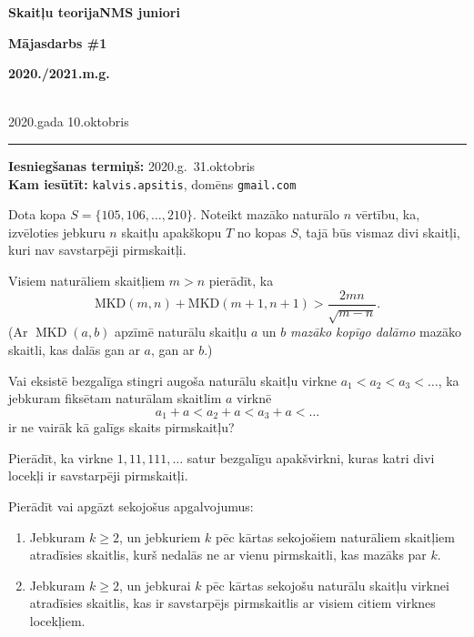 \documentclass[a4paper,12pt]{article}
\begin{document}
\begin{center}
\parbox{3.5cm}{\flushleft\bf Skaitļu teorija\linebreak NMS juniori} \hfill {\bf\LARGE Mājasdarbs \#1} \hfill \parbox{3.5cm}{\flushright\bf 2020./2021.m.g.} \\[2pt]
\rm\small 2020.gada 10.oktobris
\end{center}

\hrule

\vspace{20pt}
{\bf Iesniegšanas termiņš:} 2020.g.\ 31.oktobris\\
{\bf Kam iesūtīt:} {\tt kalvis.apsitis}, domēns {\tt gmail.com}


\vspace{20pt}
\begin{problem}
Dota kopa $S = \{ 105,106,\ldots,210 \}$. Noteikt mazāko
naturālo $n$ vērtību, ka, izvēloties jebkuru $n$ skaitļu
apakškopu $T$ no kopas $S$, tajā būs vismaz divi skaitļi, kuri nav
savstarpēji pirmskaitļi.
\end{problem}

\vspace{20pt}
\begin{problem} 
Visiem naturāliem skaitļiem $m > n$ pierādīt, ka
$$\mbox{MKD}(m,n) + \mbox{MKD}(m+1,n+1) > \frac{2mn}{\sqrt{m-n}}.$$
(Ar $\operatorname{MKD}(a,b)$ apzīmē naturālu skaitļu $a$ un $b$ {\em mazāko 
kopīgo dalāmo} \textendash{} mazāko skaitli, kas dalās gan ar $a$, gan ar $b$.)
\end{problem}

\vspace{20pt}
\begin{problem}
Vai eksistē bezgalīga
stingri augoša naturālu skaitļu virkne $a_1 < a_2 < a_3 <\ldots$,
ka jebkuram fiksētam naturālam skaitlim $a$ virknē 
$$a_1+a < a_2+a < a_3 + a < \ldots$$
ir ne vairāk kā galīgs skaits pirmskaitļu?
\end{problem}

\vspace{20pt}
\begin{problem}
Pierādīt, ka virkne $1,11,111,\ldots$ satur bezgalīgu apakšvirkni,
kuras katri divi locekļi ir savstarpēji pirmskaitļi.
\end{problem}



\vspace{20pt}
\begin{problem}
Pierādīt vai apgāzt sekojošus apgalvojumus:
\begin{enumerate}
\item Jebkuram $k \geq 2$, un jebkuriem $k$ pēc kārtas sekojošiem naturāliem 
skaitļiem atradīsies skaitlis, kurš nedalās ne ar vienu pirmskaitli, kas mazāks par $k$.   
\item Jebkuram $k \geq 2$, un jebkurai $k$ pēc kārtas sekojošu naturālu skaitļu virknei atradīsies skaitlis, kas ir savstarpējs pirmskaitlis ar visiem citiem virknes locekļiem. 
\end{enumerate}
\end{problem}
\end{document}
